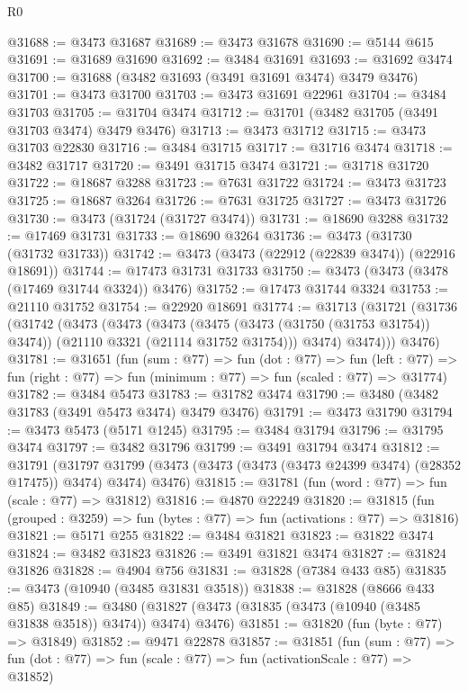\begin{lexlean}{R0}
\begin{coremodule}
@31688 := @3473 @31687
@31689 := @3473 @31678
@31690 := @5144 @615
@31691 := @31689 @31690
@31692 := @3484 @31691
@31693 := @31692 @3474
@31700 := @31688 (@3482 @31693 (@3491 @31691 @3474) @3479 @3476)
@31701 := @3473 @31700
@31703 := @3473 @31691 @22961
@31704 := @3484 @31703
@31705 := @31704 @3474
@31712 := @31701 (@3482 @31705 (@3491 @31703 @3474) @3479 @3476)
@31713 := @3473 @31712
@31715 := @3473 @31703 @22830
@31716 := @3484 @31715
@31717 := @31716 @3474
@31718 := @3482 @31717
@31720 := @3491 @31715 @3474
@31721 := @31718 @31720
@31722 := @18687 @3288
@31723 := @7631 @31722
@31724 := @3473 @31723
@31725 := @18687 @3264
@31726 := @7631 @31725
@31727 := @3473 @31726
@31730 := @3473 (@31724 (@31727 @3474))
@31731 := @18690 @3288
@31732 := @17469 @31731
@31733 := @18690 @3264
@31736 := @3473 (@31730 (@31732 @31733))
@31742 := @3473 (@3473 (@22912 (@22839 @3474)) (@22916 @18691))
@31744 := @17473 @31731 @31733
@31750 := @3473 (@3473 (@3478 (@17469 @31744 @3324)) @3476)
@31752 := @17473 @31744 @3324
@31753 := @21110 @31752
@31754 := @22920 @18691
@31774 := @31713
    (@31721
      (@31736
        (@31742
          (@3473
            (@3473
              (@3473
                (@3475 (@3473 (@31750 (@31753 @31754)) @3474))
                (@21110 @3321 (@21114 @31752 @31754)))
              @3474)
            @3474)))
      @3476)
@31781 := @31651
    (fun (sum : @77) =>
    fun (dot : @77) =>
    fun (left : @77) => fun (right : @77) => fun (minimum : @77) => fun (scaled : @77) => @31774)
@31782 := @3484 @5473
@31783 := @31782 @3474
@31790 := @3480 (@3482 @31783 (@3491 @5473 @3474) @3479 @3476)
@31791 := @3473 @31790
@31794 := @3473 @5473 (@5171 @1245)
@31795 := @3484 @31794
@31796 := @31795 @3474
@31797 := @3482 @31796
@31799 := @3491 @31794 @3474
@31812 := @31791
    (@31797 @31799 (@3473 (@3473 (@3473 (@3473 @24399 @3474) (@28352 @17475)) @3474) @3474) @3476)
@31815 := @31781 (fun (word : @77) => fun (scale : @77) => @31812)
@31816 := @4870 @22249
@31820 := @31815 (fun (grouped : @3259) => fun (bytes : @77) => fun (activations : @77) => @31816)
@31821 := @5171 @255
@31822 := @3484 @31821
@31823 := @31822 @3474
@31824 := @3482 @31823
@31826 := @3491 @31821 @3474
@31827 := @31824 @31826
@31828 := @4904 @756
@31831 := @31828 (@7384 @433 @85)
@31835 := @3473 (@10940 (@3485 @31831 @3518))
@31838 := @31828 (@8666 @433 @85)
@31849 := @3480 (@31827 (@3473 (@31835 (@3473 (@10940 (@3485 @31838 @3518)) @3474)) @3474) @3476)
@31851 := @31820 (fun (byte : @77) => @31849)
@31852 := @9471 @22878
@31857 := @31851
    (fun (sum : @77) =>
    fun (dot : @77) => fun (scale : @77) => fun (activationScale : @77) => @31852)

\end{coremodule}
\end{lexlean}
